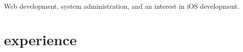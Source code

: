 \documentclass[]{cv-style} %
\begin{document}
Web development, system administration, and an interest in iOS development.


\section{experience}

%
%
%
%
\end{document}
